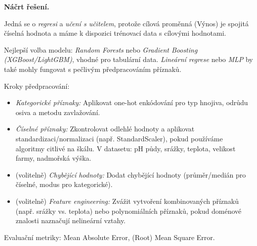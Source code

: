 \medskip
\noindent\textbf{Náčrt řešení.}\par
Jedná se o \textit{regresi} a \textit{učení s učitelem}, protože cílová proměnná (Výnos) je spojitá
číselná hodnota a máme k dispozici trénovací data s cílovými hodnotami.

Nejlepší volba modelu: \textit{Random Forests} nebo \textit{Gradient Boosting (XGBoost/LightGBM)},
vhodné pro tabulární data. \textit{Lineární regrese} nebo \textit{MLP} by také mohly fungovat
s pečlivým předpracováním příznaků.

Kroky předpracování:
\begin{itemize}
  \item \textit{Kategorické příznaky:} Aplikovat one-hot enkódování pro typ hnojiva, odrůdu osiva
    a metodu zavlažování.
  \item \textit{Číselné příznaky:} Zkontrolovat odlehlé hodnoty a aplikovat standardizaci/normalizaci
    (např. StandardScaler), pokud používáme algoritmy citlivé na škálu. V datasetu: pH půdy, srážky,
    teplota, velikost farmy, nadmořská výška.
  \item (volitelně) \textit{Chybějící hodnoty:} Dodat chybějící hodnoty (průměr/medián pro číselné,
    modus pro kategorické).
  \item (volitelně) \textit{Feature engineering:} Zvážit vytvoření kombinovaných příznaků (např.
    srážky vs. teplota) nebo polynomiálních příznaků, pokud doménové znalosti naznačují nelineární vztahy.
\end{itemize}

Evaluační metriky: Mean Absolute Error, (Root) Mean Square Error.
